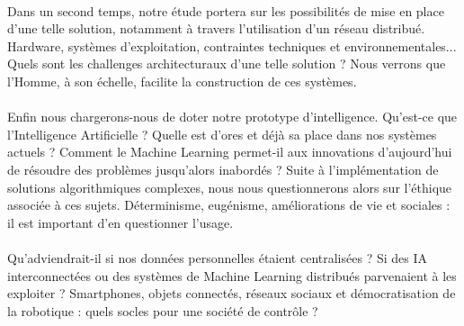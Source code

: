 \paragraph{} Dans un second temps, notre étude portera sur les possibilités de mise en place
d'une telle solution, notamment à travers l'utilisation d'un réseau distribué. Hardware,
systèmes d'exploitation, contraintes techniques et environnementales... Quels sont les challenges
architecturaux d'une telle solution ? Nous verrons que l'Homme, à son échelle, facilite la 
construction de ces systèmes.

\paragraph{} Enfin nous chargerons-nous de doter notre prototype d'intelligence. Qu'est-ce que
l'Intelligence Artificielle ? Quelle est d'ores et déjà sa place dans nos systèmes actuels ?
Comment le Machine Learning permet-il aux innovations d'aujourd'hui de résoudre des problèmes
jusqu'alors inabordés ? Suite à l'implémentation de solutions algorithmiques complexes,
nous nous questionnerons alors sur l'éthique associée à ces sujets. Déterminisme,
eugénisme, améliorations de vie et sociales : il est important d'en questionner l'usage.




\paragraph{}  Qu'adviendrait-il si nos données personnelles étaient centralisées ? Si des IA interconnectées
ou des systèmes de Machine Learning distribués parvenaient à les exploiter ? Smartphones,
objets connectés, réseaux sociaux et démocratisation de la robotique : quels socles pour une
société de contrôle ?





